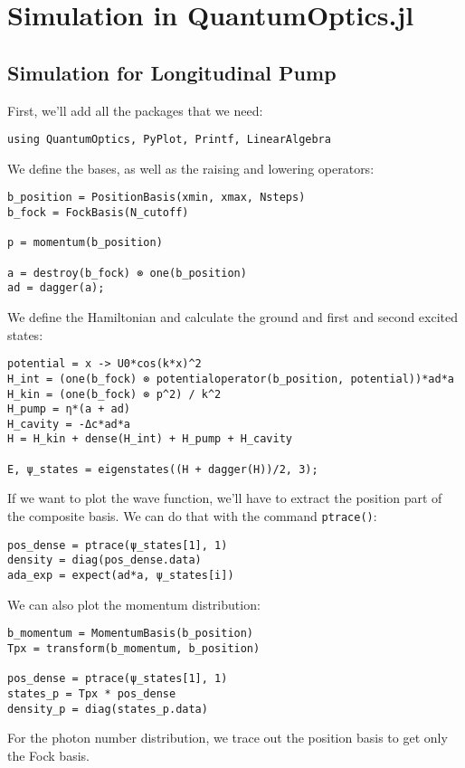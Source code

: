 \section{Simulation in QuantumOptics.jl}

\subsection{Simulation for Longitudinal Pump}

First, we'll add all the packages that we need:

\begin{lstlisting}
using QuantumOptics, PyPlot, Printf, LinearAlgebra
\end{lstlisting}We define the bases, as well as the raising and lowering operators:

\begin{lstlisting}
b_position = PositionBasis(xmin, xmax, Nsteps)
b_fock = FockBasis(N_cutoff)

p = momentum(b_position)

a = destroy(b_fock) ⊗ one(b_position)
ad = dagger(a);
\end{lstlisting}We define the Hamiltonian and calculate the ground and first and second excited states:

\begin{lstlisting}
potential = x -> U0*cos(k*x)^2
H_int = (one(b_fock) ⊗ potentialoperator(b_position, potential))*ad*a
H_kin = (one(b_fock) ⊗ p^2) / k^2
H_pump = η*(a + ad)
H_cavity = -Δc*ad*a
H = H_kin + dense(H_int) + H_pump + H_cavity

E, ψ_states = eigenstates((H + dagger(H))/2, 3);
\end{lstlisting}If we want to plot the wave function, we'll have to extract the position part of the composite basis. We can do that with the command \texttt{ptrace()}:

\begin{lstlisting}
pos_dense = ptrace(ψ_states[1], 1)
density = diag(pos_dense.data)
ada_exp = expect(ad*a, ψ_states[i])
\end{lstlisting} We can also plot the momentum distribution:

\begin{lstlisting}
b_momentum = MomentumBasis(b_position)
Tpx = transform(b_momentum, b_position)

pos_dense = ptrace(ψ_states[1], 1)
states_p = Tpx * pos_dense
density_p = diag(states_p.data)
\end{lstlisting}For the photon number distribution, we trace out the position basis to get only the Fock basis.

